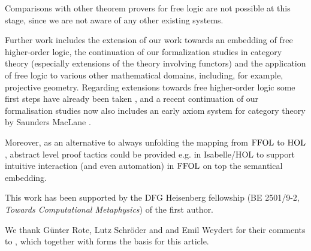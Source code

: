 

Comparisons with other theorem provers for free logic are not possible at this stage, since we are not aware of any other existing systems.

Further work includes the extension of our work towards an embedding
of free higher-order logic, the continuation of our formalization
studies in category theory (especially extensions of the theory
involving functors) and the application of free logic to
various other mathematical domains, including, for example, projective
geometry.  Regarding extensions towards free higher-order logic some
first steps have already been taken
\cite{W56,makarenko16:_autom_logik_logik_stufe}, and a recent
continuation of our formalisation studies \cite{J39} now also includes 
an early axiom system for category theory by Saunders MacLane
\cite{maclane48:_group}.


Moreover, as an alternative to always unfolding the mapping from
$\text{\textrm{FFOL}}$ to $\text{\textrm{HOL}}$, abstract level proof tactics could be provided
e.g. in Isabelle/HOL to support intuitive interaction (and even
automation) in $\text{\textrm{FFOL}}$ on top the semantical embedding.

\begin{acknowledgements}
This work has been supported by the DFG Heisenberg fellowship (BE
2501/9-2, \emph{Towards Computational Metaphysics}) of the first
author.

We thank G{\"u}nter Rote, Lutz Schr\"oder and and Emil Weydert for their
comments to \cite{ArXiv}, which together with \cite{ICMS} forms the
basis for this article.

\end{acknowledgements}





